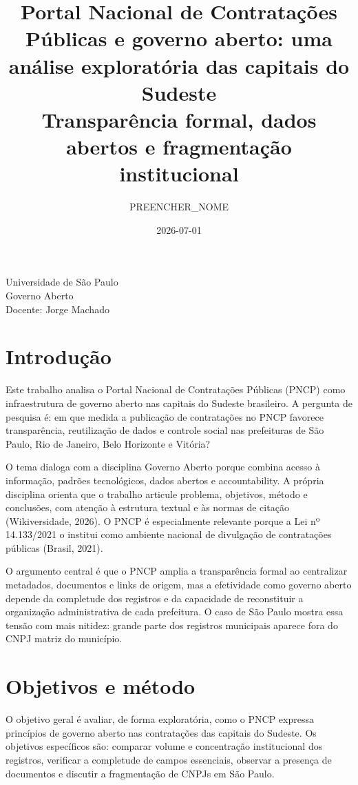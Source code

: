 \documentclass[12pt]{article}
\title{Portal Nacional de Contratações Públicas e governo aberto: uma
análise exploratória das capitais do Sudeste\\\large Transparência
formal, dados abertos e fragmentação institucional}
\author{PREENCHER\_NOME}
\date{2026-07-01}
\begin{document}
\maketitle

\begin{center}
Universidade de São Paulo\\
Governo Aberto\\
Docente: Jorge Machado
\end{center}

\thispagestyle{empty}
\newpage
\setcounter{page}{1}

\section{Introdução}\label{introduuxe7uxe3o}

Este trabalho analisa o Portal Nacional de Contratações Públicas (PNCP)
como infraestrutura de governo aberto nas capitais do Sudeste
brasileiro. A pergunta de pesquisa é: em que medida a publicação de
contratações no PNCP favorece transparência, reutilização de dados e
controle social nas prefeituras de São Paulo, Rio de Janeiro, Belo
Horizonte e Vitória?

O tema dialoga com a disciplina Governo Aberto porque combina acesso à
informação, padrões tecnológicos, dados abertos e accountability. A
própria disciplina orienta que o trabalho articule problema, objetivos,
método e conclusões, com atenção à estrutura textual e às normas de
citação (Wikiversidade, 2026). O PNCP é especialmente relevante porque a
Lei nº 14.133/2021 o institui como ambiente nacional de divulgação de
contratações públicas (Brasil, 2021).

O argumento central é que o PNCP amplia a transparência formal ao
centralizar metadados, documentos e links de origem, mas a efetividade
como governo aberto depende da completude dos registros e da capacidade
de reconstituir a organização administrativa de cada prefeitura. O caso
de São Paulo mostra essa tensão com mais nitidez: grande parte dos
registros municipais aparece fora do CNPJ matriz do município.

\section{Objetivos e método}\label{objetivos-e-muxe9todo}

O objetivo geral é avaliar, de forma exploratória, como o PNCP expressa
princípios de governo aberto nas contratações das capitais do Sudeste.
Os objetivos específicos são: comparar volume e concentração
institucional dos registros, verificar a completude de campos
essenciais, observar a presença de documentos e discutir a fragmentação
de CNPJs em São Paulo.
\end{document}
